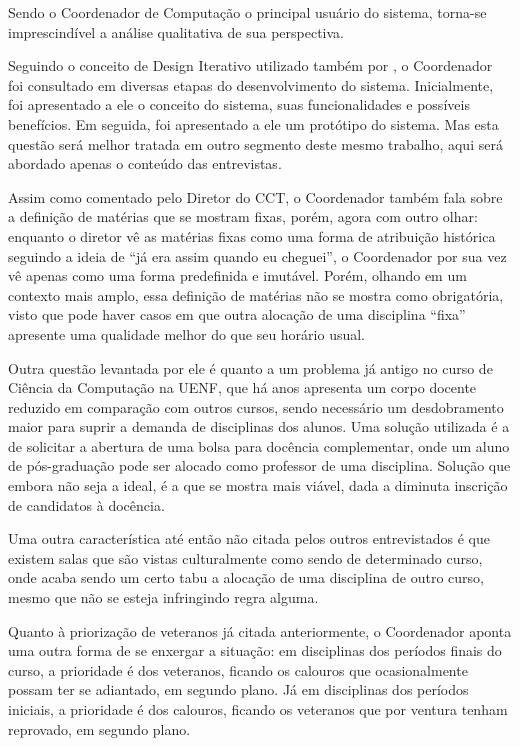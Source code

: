 Sendo o Coordenador de Computação o principal usuário do sistema, torna-se imprescindível a análise qualitativa de sua perspectiva.

Seguindo o conceito de Design Iterativo utilizado também por \cite{andre_interaction_2018}, o Coordenador foi consultado em diversas etapas do desenvolvimento do sistema. Inicialmente, foi apresentado a ele o conceito do sistema, suas funcionalidades e possíveis benefícios. Em seguida, foi apresentado a ele um protótipo do sistema. Mas esta questão será melhor tratada em outro segmento deste mesmo trabalho, aqui será abordado apenas o conteúdo das entrevistas.

Assim como comentado pelo Diretor do CCT, o Coordenador também fala sobre a definição de matérias que se mostram fixas, porém, agora com outro olhar: enquanto o diretor vê as matérias fixas como uma forma de atribuição histórica seguindo a ideia de ``já era assim quando eu cheguei'', o Coordenador por sua vez vê apenas como uma forma predefinida e imutável. Porém, olhando em um contexto mais amplo, essa definição de matérias não se mostra como obrigatória, visto que pode haver casos em que outra alocação de uma disciplina ``fixa'' apresente uma qualidade melhor do que seu horário usual.

Outra questão levantada por ele é quanto a um problema já antigo no curso de Ciência da Computação na UENF, que há anos apresenta um corpo docente reduzido em comparação com outros cursos, sendo necessário um desdobramento maior para suprir a demanda de disciplinas dos alunos. Uma solução utilizada é a de solicitar a abertura de uma bolsa para docência complementar, onde um aluno de pós-graduação pode ser alocado como professor de uma disciplina. Solução que embora não seja a ideal, é a que se mostra mais viável, dada a diminuta inscrição de candidatos à docência.

Uma outra característica até então não citada pelos outros entrevistados é que existem salas que são vistas culturalmente como sendo de determinado curso, onde acaba sendo um certo tabu a alocação de uma disciplina de outro curso, mesmo que não se esteja infringindo regra alguma.

Quanto à priorização de veteranos já citada anteriormente, o Coordenador aponta uma outra forma de se enxergar a situação: em disciplinas dos períodos finais do curso, a prioridade é dos veteranos, ficando os calouros que ocasionalmente possam ter se adiantado, em segundo plano. Já em disciplinas dos períodos iniciais, a prioridade é dos calouros, ficando os veteranos que por ventura tenham reprovado, em segundo plano.

